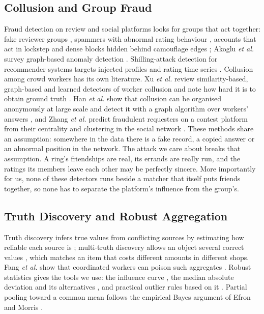 \documentclass[journal]{IEEEtran}
\begin{document}
\subsection{Collusion and Group Fraud}
Fraud detection on review and social platforms looks for groups that act together:
fake reviewer groups \cite{mukherjee2012spotting}, spammers with abnormal rating
behaviour \cite{lim2010detecting}, accounts that act in lockstep
\cite{beutel2013copycatch} and dense blocks hidden behind camouflage edges
\cite{hooi2016fraudar}; Akoglu \emph{et al.} survey graph-based anomaly detection
\cite{akoglu2015graph}. Shilling-attack detection for recommender systems targets
injected profiles and rating time series \cite{gunes2014shilling,zhou2018shilling}.
Collusion among crowd workers has its own literature. Xu \emph{et al.} review
similarity-based, graph-based and learned detectors of worker collusion and note how
hard it is to obtain ground truth \cite{xu2025collusionreview}. Han \emph{et al.}
show that collusion can be organised anonymously at large scale and detect it with a
graph algorithm over workers' answers \cite{han2025anonymous}, and Zhang \emph{et al.}
predict fraudulent requesters on a contest platform from their centrality and
clustering in the social network \cite{zhang2026sna}. These methods share an
assumption: somewhere in the data there is a fake record, a copied answer or an
abnormal position in the network. The attack we care about breaks that assumption.
A ring's friendships are real, its errands are really run, and the ratings its
members leave each other may be perfectly sincere. More importantly for us, none of
these detectors runs beside a matcher that itself puts friends together, so none has
to separate the platform's influence from the group's.

\subsection{Truth Discovery and Robust Aggregation}
Truth discovery infers true values from conflicting sources by estimating how
reliable each source is \cite{li2016truth}; multi-truth discovery allows an object
several correct values \cite{lin2018domain}, which matches an item that costs
different amounts in different shops. Fang \emph{et al.} show that coordinated
workers can poison such aggregates \cite{fang2021poisoning}. Robust statistics gives
the tools we use: the influence curve \cite{hampel1974influence}, the median absolute
deviation and its alternatives \cite{rousseeuw1993alternatives,huber2009robust}, and
practical outlier rules based on it \cite{leys2013detecting}. Partial pooling toward
a common mean follows the empirical Bayes argument of Efron and Morris
\cite{efron1975data}.
\end{document}
